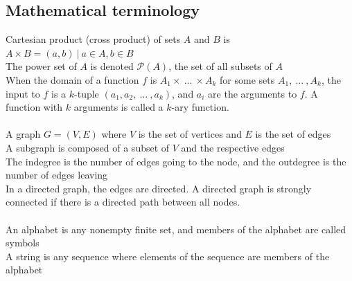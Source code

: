 \documentclass{article}
\newcommand*{\<}{\langle}
\renewcommand*{\>}{\rangle}
\begin{document}
		\subsection{Mathematical terminology}
			Cartesian product (cross product) of sets $A$ and $B$ is $A \times B = {(a, b)\:|\:a \in A, b \in B}$ \\
			The power set of $A$ is denoted $\mathcal{P}(A)$, the set of all subsets of $A$ \\
			When the domain of a function $f$ is $A_1 \times\:...\:\times A_k$ for some sets $A_1,\:...\:, A_k$, the input to $f$ is a $k$-tuple $(a_1, a_2,\:...\:, a_k)$, and $a_i$ are the arguments to $f$. A function with $k$ arguments is called a $k$-ary function. \\
			\\
			A graph $G = (V, E)$ where $V$ is the set of vertices and $E$ is the set of edges \\
			A subgraph is composed of a subset of $V$ and the respective edges \\
			The indegree is the number of edges going to the node, and the outdegree is the number of edges leaving \\
			In a directed graph, the edges are directed. A directed graph is strongly connected if there is a directed path between all nodes. \\
			\\
			An alphabet is any nonempty finite set, and members of the alphabet are called symbols \\
			A string is any sequence where elements of the sequence are members of the alphabet

	
\end{document}
